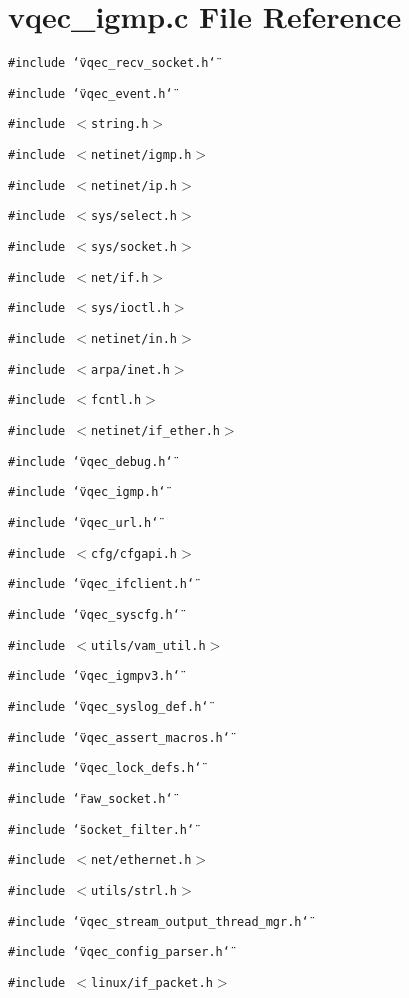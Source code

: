 \section{vqec\_\-igmp.c File Reference}
\label{vqec__igmp_8c}
{\tt \#include \char`\"{}vqec\_\-recv\_\-socket.h\char`\"{}}\par
{\tt \#include \char`\"{}vqec\_\-event.h\char`\"{}}\par
{\tt \#include $<$string.h$>$}\par
{\tt \#include $<$netinet/igmp.h$>$}\par
{\tt \#include $<$netinet/ip.h$>$}\par
{\tt \#include $<$sys/select.h$>$}\par
{\tt \#include $<$sys/socket.h$>$}\par
{\tt \#include $<$net/if.h$>$}\par
{\tt \#include $<$sys/ioctl.h$>$}\par
{\tt \#include $<$netinet/in.h$>$}\par
{\tt \#include $<$arpa/inet.h$>$}\par
{\tt \#include $<$fcntl.h$>$}\par
{\tt \#include $<$netinet/if\_\-ether.h$>$}\par
{\tt \#include \char`\"{}vqec\_\-debug.h\char`\"{}}\par
{\tt \#include \char`\"{}vqec\_\-igmp.h\char`\"{}}\par
{\tt \#include \char`\"{}vqec\_\-url.h\char`\"{}}\par
{\tt \#include $<$cfg/cfgapi.h$>$}\par
{\tt \#include \char`\"{}vqec\_\-ifclient.h\char`\"{}}\par
{\tt \#include \char`\"{}vqec\_\-syscfg.h\char`\"{}}\par
{\tt \#include $<$utils/vam\_\-util.h$>$}\par
{\tt \#include \char`\"{}vqec\_\-igmpv3.h\char`\"{}}\par
{\tt \#include \char`\"{}vqec\_\-syslog\_\-def.h\char`\"{}}\par
{\tt \#include \char`\"{}vqec\_\-assert\_\-macros.h\char`\"{}}\par
{\tt \#include \char`\"{}vqec\_\-lock\_\-defs.h\char`\"{}}\par
{\tt \#include \char`\"{}raw\_\-socket.h\char`\"{}}\par
{\tt \#include \char`\"{}socket\_\-filter.h\char`\"{}}\par
{\tt \#include $<$net/ethernet.h$>$}\par
{\tt \#include $<$utils/strl.h$>$}\par
{\tt \#include \char`\"{}vqec\_\-stream\_\-output\_\-thread\_\-mgr.h\char`\"{}}\par
{\tt \#include \char`\"{}vqec\_\-config\_\-parser.h\char`\"{}}\par
{\tt \#include $<$linux/if\_\-packet.h$>$}\par
